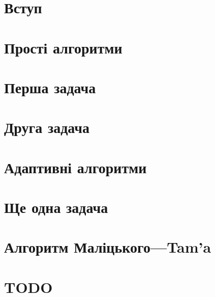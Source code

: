 \documentclass[a4paper,14pt,openany,oneside,oldfontcommands]{memoir}
\begin{document}
 
\newpage
\tableofcontents
\newpage

\setcounter{page}{3}

\chapter{Вступ}

\newpage

\chapter{Прості алгоритми}

\newpage

\newpage

\chapter{Перша задача}

\newpage

\newpage

\chapter{Друга задача}

\newpage

\newpage

\chapter{Адаптивні алгоритми}

\newpage

\newpage

\newpage

\chapter{Ще одна задача}

\newpage

\newpage

\chapter{Алгоритм Маліцького---Tam'a}

\newpage

\newpage

\newpage

\chapter{TODO}

\end{document}

